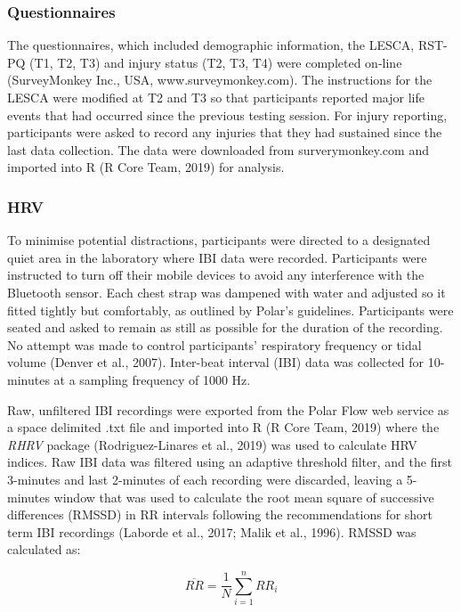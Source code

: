 \documentclass[
  english,
  man]{apa6}
\begin{document}
\hypertarget{questionnaires}{%
\subsubsection{Questionnaires}\label{questionnaires}}

The questionnaires, which included demographic information, the LESCA, RST-PQ (T1, T2, T3) and injury status (T2, T3, T4) were completed on-line (SurveyMonkey Inc., USA, www.surveymonkey.com).
The instructions for the LESCA were modified at T2 and T3 so that participants reported major life events that had occurred since the previous testing session.
For injury reporting, participants were asked to record any injuries that they had sustained since the last data collection.
The data were downloaded from surverymonkey.com and imported into R (R Core Team, 2019) for analysis.

\hypertarget{hrv}{%
\subsubsection{HRV}\label{hrv}}

To minimise potential distractions, participants were directed to a designated quiet area in the laboratory where IBI data were recorded.
Participants were instructed to turn off their mobile devices to avoid any interference with the Bluetooth sensor.
Each chest strap was dampened with water and adjusted so it fitted tightly but comfortably, as outlined by Polar's guidelines.
Participants were seated and asked to remain as still as possible for the duration of the recording.
No attempt was made to control participants' respiratory frequency or tidal volume (Denver et al., 2007).
Inter-beat interval (IBI) data was collected for 10-minutes at a sampling frequency of 1000 Hz.

Raw, unfiltered IBI recordings were exported from the Polar Flow web service as a space delimited .txt file and imported into R (R Core Team, 2019) where the \emph{RHRV} package (Rodriguez-Linares et al., 2019) was used to calculate HRV indices.
Raw IBI data was filtered using an adaptive threshold filter, and the first 3-minutes and last 2-minutes of each recording were discarded, leaving a 5-minutes window that was used to calculate the root mean square of successive differences (RMSSD) in RR intervals following the recommendations for short term IBI recordings (Laborde et al., 2017; Malik et al., 1996). RMSSD was calculated as:

\begin{equation} 
  \overline{RR} = \frac{1}{N} \sum_{i=1}^{n} RR_i
\end{equation}
\end{document}

